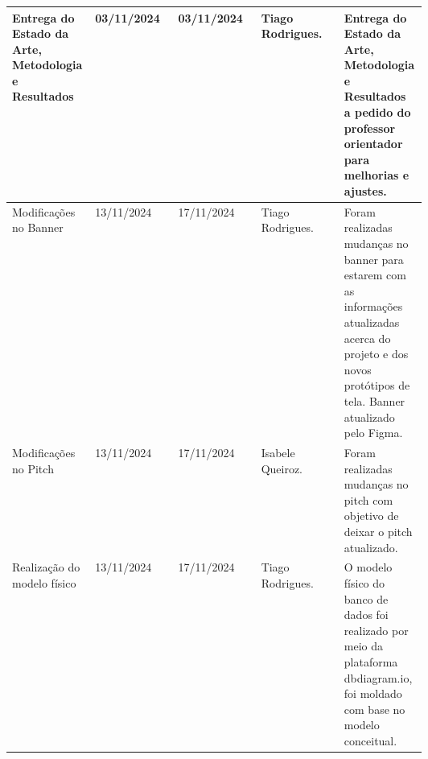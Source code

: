 \documentclass[
landscape,
  a4paper,
  12pt,
  english,
  brazilian,
]{article}
\begin{document}
 \begin{table}[]
\centering


\begin{tabular}{|>{\raggedright\arraybackslash}p{0.2\linewidth}|l|l|>{\raggedright\arraybackslash}p{0.2\linewidth}|>{\raggedright\arraybackslash}p{0.2\linewidth}|}

\hline

 Entrega do Estado da Arte, Metodologia e Resultados& 03/11/2024& 03/11/2024& Tiago Rodrigues.&Entrega do Estado da Arte, Metodologia e Resultados a pedido do professor orientador para melhorias e ajustes.\\\hline
                  Modificações no Banner&                            13/11/2024&                17/11/2024&                 Tiago Rodrigues.&                                  Foram realizadas mudanças no banner para estarem com as informações atualizadas acerca do projeto e dos novos protótipos de tela. Banner atualizado pelo Figma.\\ \hline
                  Modificações no Pitch&                            13/11/2024&                17/11/2024&                 Isabele Queiroz.&                                  Foram realizadas mudanças no pitch com objetivo de deixar o pitch atualizado.\\ \hline
                  Realização do modelo físico&                            13/11/2024&                17/11/2024&                 Tiago Rodrigues.&                                  O modelo físico do banco de dados foi realizado por meio da plataforma dbdiagram.io, foi moldado com base no modelo conceitual.\\ \hline                  
\end{tabular}


\end{table}
\end{document}
